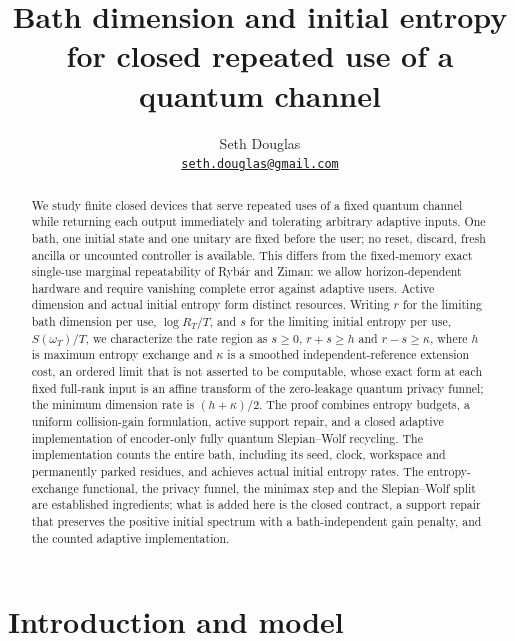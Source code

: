 \documentclass[11pt,a4paper]{article}
\title{Bath dimension and initial entropy for closed repeated use of a
quantum channel}
\author{Seth Douglas\\\href{mailto:seth.douglas@gmail.com}{\texttt{seth.douglas@gmail.com}}}
\date{}
\numberwithin{equation}{section}
\theoremstyle{plain}
\theoremstyle{definition}
\begin{document}
\maketitle

\begin{abstract}
We study finite closed devices that serve repeated uses of a fixed quantum
channel while returning each output immediately and tolerating arbitrary
adaptive inputs. One bath, one initial state and one unitary are fixed before
the user; no reset, discard, fresh ancilla or uncounted controller is
available. This differs from the fixed-memory exact single-use marginal
repeatability of Ryb\'ar and Ziman: we allow horizon-dependent hardware and
require vanishing complete error against adaptive users. Active
dimension and actual initial entropy form distinct resources. Writing $r$ for
the limiting bath dimension per use, $\log R_T/T$, and $s$ for the limiting
initial entropy per use, $S(\omega_T)/T$, we characterize the rate region as
$s\ge 0$, $r+s\ge h$ and $r-s\ge\kappa$, where $h$ is maximum entropy exchange
and $\kappa$ is a smoothed independent-reference extension cost, an ordered
limit that is not asserted to be computable, whose exact form at each fixed
full-rank input is an affine transform of the
zero-leakage quantum privacy funnel; the minimum dimension rate is
$(h+\kappa)/2$. The proof combines entropy budgets,
a uniform collision-gain formulation, active support repair, and a closed
adaptive implementation of encoder-only fully quantum Slepian--Wolf recycling.
The implementation counts the entire bath, including its seed, clock,
workspace and permanently parked residues, and achieves actual initial entropy
rates. The entropy-exchange functional, the privacy funnel, the minimax step
and the Slepian--Wolf split are established ingredients; what is added here is
the closed contract, a support repair that preserves the positive initial
spectrum with a bath-independent gain penalty, and the counted adaptive
implementation.
\end{abstract}

\section{Introduction and model}
\label{sec:model}
\end{document}
